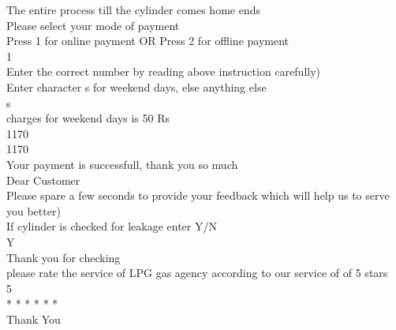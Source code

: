 \documentclass{article}
\begin{document}
{The entire process till the cylinder comes home ends\\
Please select your mode of payment\\
Press 1 for online payment OR Press 2 for offline payment\\
1\\
Enter the correct number by reading above instruction carefully)\\
Enter character s for weekend days, else anything else\\
s\\
charges for weekend days is 50 Rs\\
1170\\
1170\\
Your payment is successfull, thank you so much\\
Dear Customer\\
Please spare a few seconds to provide your feedback which will help us to serve you better)\\
If cylinder is checked for leakage enter Y/N\\
Y\\
Thank you for checking\\

please rate the service of LPG gas agency according to our service of of 5 stars\\
5\\
* * * * * *\\
Thank You\\
\\
\\
}
\end{document}

